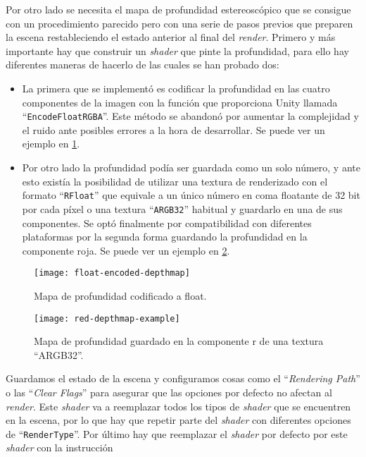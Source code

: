 Por otro lado se necesita el mapa de profundidad estereoscópico que se consigue con un procedimiento parecido pero con una serie de pasos previos que preparen la escena restableciendo el estado anterior al final del \textit{render}. Primero y más importante hay que construir un \textit{shader} que pinte la profundidad, para ello hay diferentes maneras de hacerlo de las cuales se han probado dos:

\begin{itemize}
\item La primera que se implementó es codificar la profundidad en las cuatro componentes de la imagen con la función que proporciona Unity llamada ``\texttt{EncodeFloatRGBA}''. Este método se abandonó por aumentar la complejidad y el ruido ante posibles errores a la hora de desarrollar. Se puede ver un ejemplo en \ref{fig:float-encoded-depthmap-example}.
\item Por otro lado la profundidad podía ser guardada como un solo número, y ante esto existía la posibilidad de utilizar una textura de renderizado con el formato ``\texttt{RFloat}'' que equivale a un único número en coma floatante de 32 bit por cada píxel o una textura ``\texttt{ARGB32}'' habitual y guardarlo en una de sus componentes. Se optó finalmente por compatibilidad con diferentes plataformas por la segunda forma guardando la profundidad en la componente roja. Se puede ver un ejemplo en \ref{fig:red-depthmap-encoded-example}.
\end{itemize}


\begin{figure}[H]
  \centering
  \texttt{[image: float-encoded-depthmap]}
  \caption{Mapa de profundidad codificado a float.}
  \label{fig:float-encoded-depthmap-example}
\end{figure}

\begin{figure}[H]
  \centering
  \texttt{[image: red-depthmap-example]}
  \caption{Mapa de profundidad guardado en la componente r de una textura ``ARGB32''.}
  \label{fig:red-depthmap-encoded-example}
\end{figure}
\FloatBarrier

Guardamos el estado de la escena y configuramos cosas como el ``\textit{Rendering Path}'' o las ``\textit{Clear Flags}'' para asegurar que las opciones por defecto no afectan al \textit{render}. Este \textit{shader} va a reemplazar todos los tipos de \textit{shader} que se encuentren en la escena, por lo que hay que repetir parte del \textit{shader} con diferentes opciones de ``\texttt{RenderType}''. Por último hay que reemplazar el \textit{shader} por defecto por este \textit{shader} con la instrucción 

